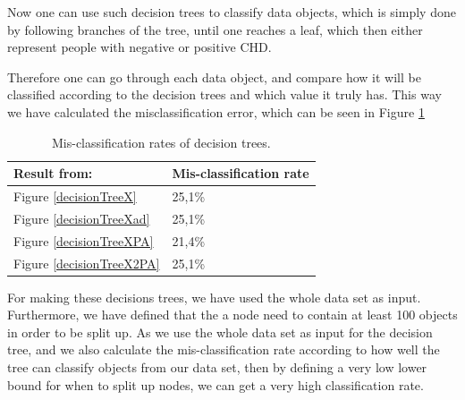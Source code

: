 Now one can use such decision trees to classify data objects, which is simply done by following branches of the tree, until one reaches a leaf, which then either represent people with negative or positive CHD.

Therefore one can go through each data object, and compare how it will be classified according to the decision trees and which value it truly has. This way we have calculated the misclassification error, which can be seen in Figure \ref{decisionTreeErrorRate}

\begin{table}
\begin{longtable}{|l|l|}
Result from: & Mis-classification rate \\ \hline
Figure \ref{decisionTreeX} & 25,1\% \\ \hline 
Figure \ref{decisionTreeXad} & 25,1\% \\ \hline
Figure \ref{decisionTreeXPA} & 21,4\% \\ \hline
Figure \ref{decisionTreeX2PA} & 25,1\% \\ \hline
\end{longtable}
\caption{Mis-classification rates of decision trees.}
\label{decisionTreeErrorRate}
\end{table}

For making these decisions trees, we have used the whole data set as input. Furthermore, we have defined that the a node need to contain at least 100 objects in order to be split up. As we use the whole data set as input for the decision tree, and we also calculate the mis-classification rate according to how well the tree can classify objects from our data set, then by defining a very low lower bound for when to split up nodes, we can get a very high classification rate.
